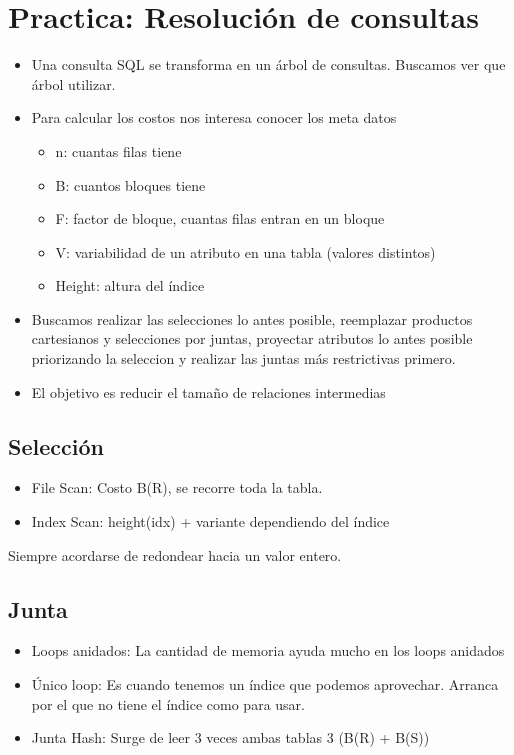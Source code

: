 \section{Practica: Resolución de consultas}
\begin{itemize}
\item Una consulta SQL se transforma en un árbol de consultas. Buscamos ver que árbol utilizar.
\item Para calcular los costos nos interesa conocer los meta datos
    \begin{itemize}
    \item n: cuantas filas tiene
    \item B: cuantos bloques tiene
    \item F: factor de bloque, cuantas filas entran en un bloque
    \item V: variabilidad de un atributo en una tabla (valores distintos)
    \item Height: altura del índice
    \end{itemize}
\item Buscamos realizar las selecciones lo antes posible, reemplazar productos cartesianos y selecciones por juntas, proyectar atributos lo antes posible priorizando la seleccion y realizar las juntas más restrictivas primero.
\item El objetivo es reducir el tamaño de relaciones intermedias
\end{itemize}


\subsection*{Selección}

\begin{itemize}
\item File Scan: Costo B(R), se recorre toda la tabla.
\item Index Scan: height(idx) + variante dependiendo del índice
\end{itemize}

Siempre acordarse de redondear hacia un valor entero.

\subsection*{Junta}
\begin{itemize}
\item Loops anidados: La cantidad de memoria ayuda mucho en los loops anidados
\item Único loop: Es cuando tenemos un índice que podemos aprovechar. Arranca por el que no tiene el índice como para usar.
\item Junta Hash: Surge de leer 3 veces ambas tablas 3 (B(R) + B(S))
\end{itemize}


